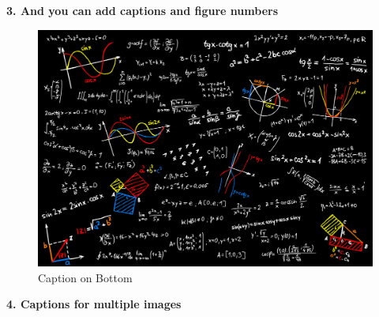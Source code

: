 \documentclass[10pt,a4paper]{article}
\begin{document}
\textbf{3. And you can add captions and figure numbers}

\begin{figure}[h!] %
	\includegraphics[width=0.3\linewidth]{math}    
    \caption{Caption on Bottom}
\end{figure}
   
\newpage
\textbf{4. Captions for multiple images}
\begin{figure}[h!]
    \label{fig:figlabel}
    \begin{center}
      \quad
      \\
      \quad
	\end{center}
\end{figure}
   
\end{document}
